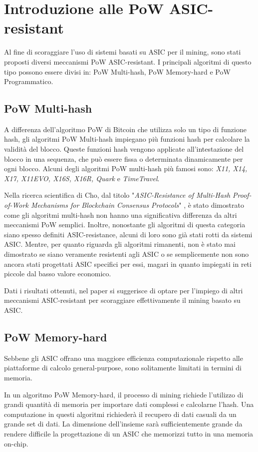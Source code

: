 \section{Introduzione alle PoW ASIC-resistant}
Al fine di scoraggiare l'uso di sistemi basati su ASIC per il mining, sono stati proposti diversi meccanismi PoW ASIC-resistant.
I principali algoritmi di questo tipo possono essere divisi in: PoW Multi-hash, PoW Memory-hard e PoW Programmatico.

\subsection{PoW Multi-hash}
A differenza dell'algoritmo PoW di Bitcoin che utilizza solo un tipo di funzione hash, gli algoritmi PoW Multi-hash impiegano più funzioni hash per calcolare la validità del blocco. Queste funzioni hash vengono applicate all'intestazione del blocco in una sequenza, che può essere fissa o determinata dinamicamente per ogni blocco. 
Alcuni degli algoritmi PoW multi-hash più famosi sono: \textit{X11, X14, X17, X11EVO, X16S, X16R, Quark} e \textit{TimeTravel}.

Nella ricerca scientifica di Cho, dal titolo "\textit{ASIC-Resistance of Multi-Hash Proof-of-Work Mechanisms for Blockchain Consensus Protocols}" \cite{asic1}, è stato dimostrato come gli algoritmi multi-hash non hanno una significativa differenza da altri meccanismi PoW semplici.
Inoltre, nonostante gli algoritmi di questa categoria siano spesso definiti ASIC-resistance, alcuni di loro sono già stati rotti da sistemi ASIC.
Mentre, per quanto riguarda gli algoritmi rimanenti, non è stato mai dimostrato se siano veramente resistenti agli ASIC o se semplicemente non sono ancora stati progettati ASIC specifici per essi, magari in quanto impiegati in reti piccole dal basso valore economico.

Dati i risultati ottenuti, nel paper si suggerisce di optare per l'impiego di altri meccanismi ASIC-resistant per scoraggiare effettivamente il mining basato su ASIC.


\subsection{PoW Memory-hard}
Sebbene gli ASIC offrano una maggiore efficienza computazionale rispetto alle piattaforme di calcolo general-purpose, sono solitamente limitati in termini di memoria.
    
In un algoritmo PoW Memory-hard, il processo di mining richiede l'utilizzo di grandi quantità di memoria per importare dati complessi e calcolarne l'hash.
Una computazione in questi algoritmi richiederà il recupero di dati casuali da un grande set di dati. 
La dimensione dell'insieme sarà sufficientemente grande da rendere difficile la progettazione di un ASIC che memorizzi tutto in una memoria on-chip.

